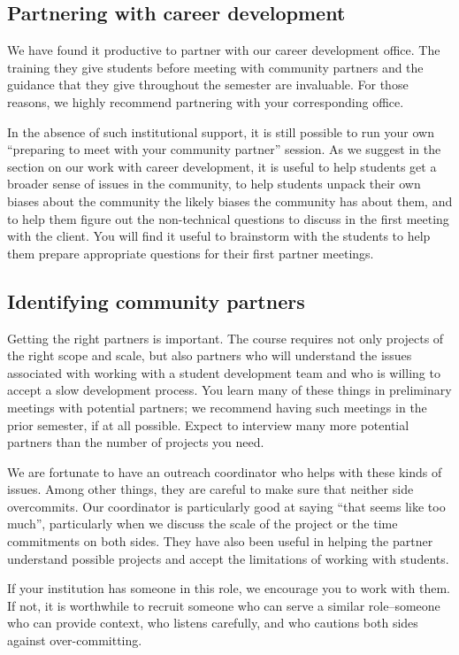 \subsection{Partnering with career development}

We have found it productive to partner with our career development
office.  The training they give students before meeting with community
partners and the guidance that they give throughout the semester
are invaluable.  For those reasons, we highly recommend 
partnering with your corresponding office.

In the absence of such institutional support, it is still possible to run
your own ``preparing to meet with your community partner'' session.
As we suggest in the section on our work with career development,
it is useful to help students get a broader sense of issues in the
community, to help students unpack their own biases about the
community the likely biases the community has about them, and to
help them figure out the non-technical questions to discuss in the
first meeting with the client.  You will find it useful to brainstorm
with the students to help them prepare appropriate questions for
their first partner meetings.

\subsection{Identifying community partners}

Getting the right partners is important.  The course requires not
only projects of the right scope and scale, but also partners who
will understand the issues associated with working with a student
development team and who is willing to accept a slow development
process.  You learn many of these things in preliminary meetings
with potential partners; we recommend having such meetings in the
prior semester, if at all possible.  Expect to interview many more
potential partners than the number of projects you need.

We are fortunate to have an outreach coordinator who helps with these kinds
of issues.  Among other things, they are careful to make sure that neither
side overcommits.  Our coordinator is particularly good at saying ``that
seems like too much'', particularly when we discuss the scale of the project
or the time commitments on both sides.  They have also been useful in
helping the partner understand possible projects and accept the limitations
of working with students.

If your institution has someone in this role, we encourage you to
work with them.  If not,
it is worthwhile to recruit someone who can serve a similar 
role--someone who can provide context, who listens carefully, and who
cautions both sides against over-committing.

